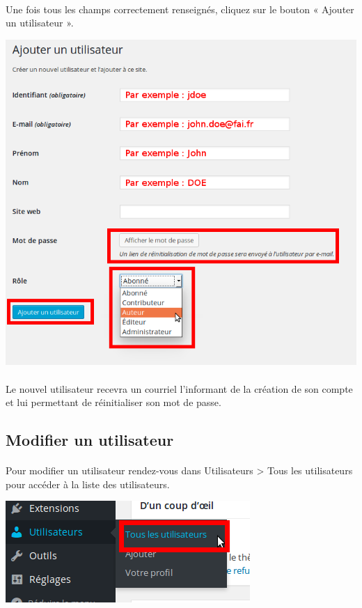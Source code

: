 \documentclass[10pt,a4paper]{article}
\begin{document}
\paragraph{}Une fois tous les champs correctement renseignés, cliquez sur le bouton « Ajouter un utilisateur ».
\begin{center}
\includegraphics[scale=0.3]{img/0158.png}
\end{center}
\paragraph{}Le nouvel utilisateur recevra un courriel l'informant de la création de son compte et lui permettant de réinitialiser son mot de passe.
\subsection{Modifier un utilisateur}
\paragraph{}Pour modifier un utilisateur rendez-vous dans Utilisateurs > Tous les utilisateurs pour accéder à la liste des utilisateurs.
\begin{center}
\includegraphics[scale=0.3]{img/0159.png}
\end{center}
\end{document}
